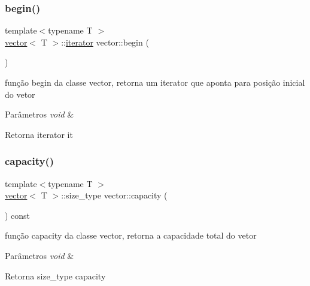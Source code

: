 \subsubsection{\texorpdfstring{begin()}{begin()}}
{\footnotesize\ttfamily template$<$typename T $>$ \\
\mbox{\hyperlink{classsc_1_1vector}{vector}}$<$ T $>$\+::\mbox{\hyperlink{classsc_1_1vector_1_1iterator}{iterator}} vector\+::begin (\begin{DoxyParamCaption}\item[{void}]{ }\end{DoxyParamCaption})}

função begin da classe vector, retorna um iterator que aponta para posição inicial do vetor 
\begin{DoxyParams}{Parâmetros}
{\em void} & \\
\hline
\end{DoxyParams}
\begin{DoxyReturn}{Retorna}
iterator it 
\end{DoxyReturn}
\mbox{\label{classsc_1_1vector_acf5f0cebfb797dac6eb42523d1e7511a}} 
\subsubsection{\texorpdfstring{capacity()}{capacity()}}
{\footnotesize\ttfamily template$<$typename T $>$ \\
\mbox{\hyperlink{classsc_1_1vector}{vector}}$<$ T $>$\+::size\+\_\+type vector\+::capacity (\begin{DoxyParamCaption}\item[{void}]{ }\end{DoxyParamCaption}) const}

função capacity da classe vector, retorna a capacidade total do vetor 
\begin{DoxyParams}{Parâmetros}
{\em void} & \\
\hline
\end{DoxyParams}
\begin{DoxyReturn}{Retorna}
size\+\_\+type capacity 
\end{DoxyReturn}
\mbox{\label{classsc_1_1vector_abf97464250caf4653a104fff421943c8}} 
